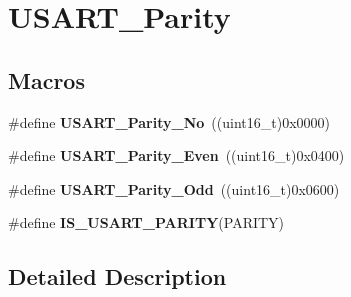 \hypertarget{group___u_s_a_r_t___parity}{\section{U\-S\-A\-R\-T\-\_\-\-Parity}
\label{group___u_s_a_r_t___parity}
}
\subsection*{Macros}
\begin{DoxyCompactItemize}
\item 
\hypertarget{group___u_s_a_r_t___parity_gab9deebcb0a859360dfec85074abaa3aa}{\#define {\bfseries U\-S\-A\-R\-T\-\_\-\-Parity\-\_\-\-No}~((uint16\-\_\-t)0x0000)}\label{group___u_s_a_r_t___parity_gab9deebcb0a859360dfec85074abaa3aa}

\item 
\hypertarget{group___u_s_a_r_t___parity_ga62193247d36fffe982e159c1f246271e}{\#define {\bfseries U\-S\-A\-R\-T\-\_\-\-Parity\-\_\-\-Even}~((uint16\-\_\-t)0x0400)}\label{group___u_s_a_r_t___parity_ga62193247d36fffe982e159c1f246271e}

\item 
\hypertarget{group___u_s_a_r_t___parity_gafcd68937a6b4b8ffff8f96e68d6a5ecd}{\#define {\bfseries U\-S\-A\-R\-T\-\_\-\-Parity\-\_\-\-Odd}~((uint16\-\_\-t)0x0600)}\label{group___u_s_a_r_t___parity_gafcd68937a6b4b8ffff8f96e68d6a5ecd}

\item 
\#define {\bfseries I\-S\-\_\-\-U\-S\-A\-R\-T\-\_\-\-P\-A\-R\-I\-T\-Y}(P\-A\-R\-I\-T\-Y)
\end{DoxyCompactItemize}


\subsection{Detailed Description}


